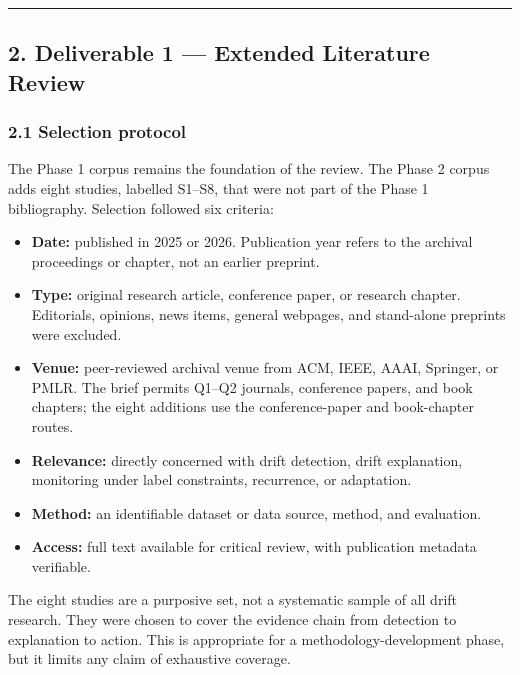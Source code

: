 \documentclass[
]{article}
\providecommand{\tightlist}{%
  \setlength{\itemsep}{0pt}\setlength{\parskip}{0pt}}
\begin{document}
\begin{center}\rule{0.5\linewidth}{0.5pt}\end{center}

\hypertarget{deliverable-1-extended-literature-review}{%
\subsection{2. Deliverable 1 --- Extended Literature
Review}\label{deliverable-1-extended-literature-review}}

\hypertarget{selection-protocol}{%
\subsubsection{2.1 Selection protocol}\label{selection-protocol}}

The Phase 1 corpus remains the foundation of the review. The Phase 2
corpus adds eight studies, labelled S1--S8, that were not part of the
Phase 1 bibliography. Selection followed six criteria:

\begin{itemize}
\tightlist
\item
  \textbf{Date:} published in 2025 or 2026. Publication year refers to
  the archival proceedings or chapter, not an earlier preprint.
\item
  \textbf{Type:} original research article, conference paper, or
  research chapter. Editorials, opinions, news items, general webpages,
  and stand-alone preprints were excluded.
\item
  \textbf{Venue:} peer-reviewed archival venue from ACM, IEEE, AAAI,
  Springer, or PMLR. The brief permits Q1--Q2 journals, conference
  papers, and book chapters; the eight additions use the
  conference-paper and book-chapter routes.
\item
  \textbf{Relevance:} directly concerned with drift detection, drift
  explanation, monitoring under label constraints, recurrence, or
  adaptation.
\item
  \textbf{Method:} an identifiable dataset or data source, method, and
  evaluation.
\item
  \textbf{Access:} full text available for critical review, with
  publication metadata verifiable.
\end{itemize}

The eight studies are a purposive set, not a systematic sample of all
drift research. They were chosen to cover the evidence chain from
detection to explanation to action. This is appropriate for a
methodology-development phase, but it limits any claim of exhaustive
coverage.
\end{document}
